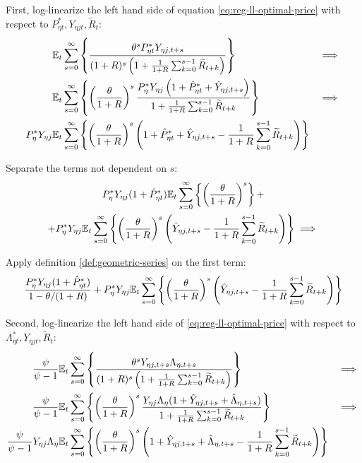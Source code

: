 \documentclass[../thesis.tex]{subfiles}
\begin{document}
First, log-linearize the left hand side of equation \ref{eq:reg-ll-optimal-price} with respect to \( P_{\eta t}^{\ast}, Y_{\eta j t}, \widetilde{R}_t \):
\begin{alignat}{2}
	& {\mathbb{E}_{t}} \sum_{s=0}^{\infty} \left\{ \frac{\theta^s P_{\eta t}^{\ast} Y_{\eta j,t+s}}{ (1 + R)^s \left( 1 + \frac{1}{1 + R} \sum_{k=0}^{s-1} \widetilde{R}_{t+k} \right)} \right\} &\implies \nonumber \\
	& {\mathbb{E}_{t}} \sum_{s=0}^{\infty} \left\{ \left( \frac{\theta}{1 + R} \right)^s  \frac{ P_{\eta}^{\ast} Y_{\eta j} \left( 1 + \hat{P}_{\eta t}^{\ast} + \hat{Y}_{\eta j, t+s} \right)}{ 1 + \frac{1}{1 + R} \sum_{k=0}^{s-1} \widetilde{R}_{t+k}} \right\} &\implies \nonumber \\
	P_{\eta}^{\ast} Y_{\eta j} &{\mathbb{E}_{t}} \sum_{s=0}^{\infty} \left\{ \left( \frac{\theta}{1 + R} \right)^s \left( 1 + \hat{P}_{\eta t}^{\ast} + \hat{Y}_{\eta j, t+s} - \frac{1}{1 + R} \sum_{k=0}^{s-1} \widetilde{R}_{t+k} \right) \right\} & \nonumber
\end{alignat}

Separate the terms not dependent on $s$:
\begin{multline}
	P_{\eta}^{\ast} Y_{\eta j} ( 1 + \hat{P}_{\eta t}^{\ast} ) {\mathbb{E}_{t}} \sum_{s=0}^{\infty} \left\{ \left( \frac{\theta}{1 + R} \right)^s \right\} + \\
	+ P_{\eta}^{\ast} Y_{\eta j} {\mathbb{E}_{t}} \sum_{s=0}^{\infty} \left\{ \left( \frac{\theta}{1 + R} \right)^s \left( \hat{Y}_{\eta j, t+s} - \frac{1}{1 + R} \sum_{k=0}^{s-1} \widetilde{R}_{t+k} \right) \right\} \implies \nonumber
\end{multline}

Apply definition \ref{def:geometric-series} on the first term:
\begin{align}
	\frac{ P_{\eta}^{\ast} Y_{\eta j} ( 1 + \hat{P}_{\eta t}^{\ast} )}{1-\theta /(1+R)} + P_{\eta}^{\ast} Y_{\eta j} {\mathbb{E}_{t}} \sum_{s=0}^{\infty} \left\{ \left( \frac{\theta}{1 + R} \right)^s \left( \hat{Y}_{\eta j, t+s} - \frac{1}{1 + R} \sum_{k=0}^{s-1} \widetilde{R}_{t+k} \right) \right\} \nonumber
\end{align}

Second, log-linearize the left hand side of \ref{eq:reg-ll-optimal-price} with respect to \( \Lambda_{\eta t}^{\ast}, Y_{\eta j t}, \widetilde{R}_t \):
\begin{alignat}{2}
	\frac{\psi}{\psi-1} &{\mathbb{E}_{t}} \sum_{s=0}^{\infty} \left\{ \frac{\theta^s Y_{\eta j,t+s} \Lambda_{\eta, t+s}}{ (1 + R)^s \left( 1 + \frac{1}{1 + R} \sum_{k=0}^{s-1} \widetilde{R}_{t+k} \right)} \right\} & \implies \nonumber \\
	\frac{\psi}{\psi-1} &{\mathbb{E}_{t}} \sum_{s=0}^{\infty} \left\{ \left( \frac{\theta}{1 + R} \right)^s \frac{ Y_{\eta j} \Lambda_{\eta} (1+ \hat{Y}_{\eta j, t+s} + \hat{\Lambda}_{\eta, t+s})}{ 1 + \frac{1}{1 + R} \sum_{k=0}^{s-1} \widetilde{R}_{t+k}} \right\} & \implies \nonumber \\
	\frac{\psi}{\psi-1} Y_{\eta j} \Lambda_{\eta} &{\mathbb{E}_{t}} \sum_{s=0}^{\infty} \left\{ \left( \frac{\theta}{1 + R} \right)^s \left( 1+ \hat{Y}_{\eta j, t+s} + \hat{\Lambda}_{\eta, t+s} - \frac{1}{1 + R} \sum_{k=0}^{s-1} \widetilde{R}_{t+k} \right) \right\} & \nonumber
\end{alignat}
\end{document}
